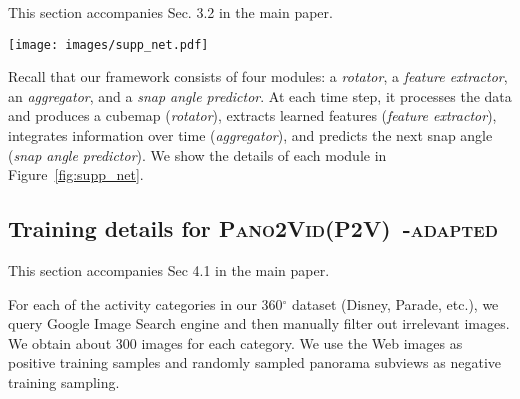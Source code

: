 This section accompanies Sec. 3.2 in the main paper.

\begin{figure*}[t]
\centering
\renewcommand{\tabcolsep}{0pt}
\texttt{[image: images/supp\_net.pdf]}%
\caption{A detailed diagram showing our network architecture. In the top, the small schematic shows the connection between each network module. Then we present the details of each module in the bottom. Our network proceeds from left to right. The \textit{feature extractor} consists of a sequence of convolutions (with kernel size and convolution stride written under the diagram) followed by a fully connected layer. In the bottom, ``FC'' denotes a fully connected layer and ``ReLU'' denotes a rectified linear unit. The \textit{aggregator} is a recurrent neural network. The ``Delay'' layer stores its current internal hidden state and outputs them at the next time step. In the end, the \textit{predictor} samples an action stochastically based on the multinomial pdf from the Softmax layer.}
\label{fig:supp_net}
\end{figure*}
    





Recall that our framework consists of four modules: a \textit{rotator}, a \textit{feature extractor}, an \textit{aggregator}, and a \textit{snap angle predictor}. At each time step, it processes the data and produces a cubemap (\textit{rotator}), extracts learned features (\textit{feature extractor}), integrates information over time (\textit{aggregator}), and predicts the next snap angle (\textit{snap angle predictor}). We show the details of each module in Figure~\ref{fig:supp_net}.



\subsection{Training details for \textsc{Pano2Vid(P2V)~\cite{su2016pano2vid}-adapted}}\label{sec:pano}

This section accompanies Sec 4.1 in the main paper.

For each of the activity categories in our 360$^{\circ}$ dataset (Disney, Parade, etc.), 
we query Google Image Search engine and then manually filter out irrelevant images. We obtain about $300$ images for each category.   
We use the Web images as positive training samples and randomly sampled panorama subviews as negative training sampling.

